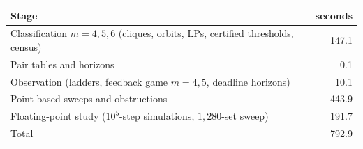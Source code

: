 \begin{tabular}{lr}
\toprule
Stage & seconds\\
\midrule
Classification $m=4,5,6$ (cliques, orbits, LPs, certified thresholds, census) & 147.1\\
Pair tables and horizons & 0.1\\
Observation (ladders, feedback game $m=4,5$, deadline horizons) & 10.1\\
Point-based sweeps and obstructions & 443.9\\
Floating-point study ($10^5$-step simulations, $1{,}280$-set sweep) & 191.7\\
Total & 792.9\\
\bottomrule
\end{tabular}
